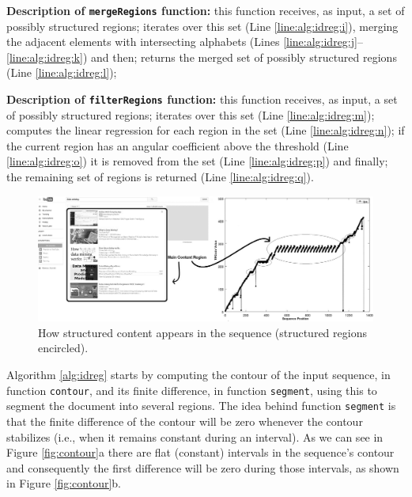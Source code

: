 \textbf{Description of \texttt{mergeRegions} function:} this function
receives, as input, a set of possibly structured regions; iterates over this set (Line
\ref{line:alg:idreg:i}), merging the adjacent elements with intersecting alphabets (Lines
\ref{line:alg:idreg:j}--\ref{line:alg:idreg:k}) and then; returns the merged set
of possibly structured regions (Line \ref{line:alg:idreg:l});

\textbf{Description of \texttt{filterRegions} function:} this function
receives, as input, a set of possibly structured regions; iterates over this set (Line
\ref{line:alg:idreg:m}); computes the linear regression for each region in the
set (Line \ref{line:alg:idreg:n}); if the current region has an angular
coefficient above the threshold (Line \ref{line:alg:idreg:o}) it is removed from the set
(Line \ref{line:alg:idreg:p}) and finally; the remaining set of regions is
returned (Line \ref{line:alg:idreg:q}).

\begin{figure}[h]
  \centering
     \includegraphics[width=400pt]{img/main-reg.jpg}
  \caption{\small{How structured content appears in the sequence (structured regions encircled).}}
  \label{fig:stru}
\end{figure}

Algorithm \ref{alg:idreg} starts by computing the contour of the input sequence,
in function \texttt{contour}, and its finite difference, in function
\texttt{segment}, using this to segment the document into several regions.
The idea behind function \texttt{segment} is that the finite difference of
the contour will be zero whenever the contour stabilizes (i.e., when it
remains constant during an interval). As we can see in Figure
\ref{fig:contour}a there are flat (constant) intervals in the sequence's
contour and consequently the first difference will be zero during those
intervals, as shown in Figure \ref{fig:contour}b.


